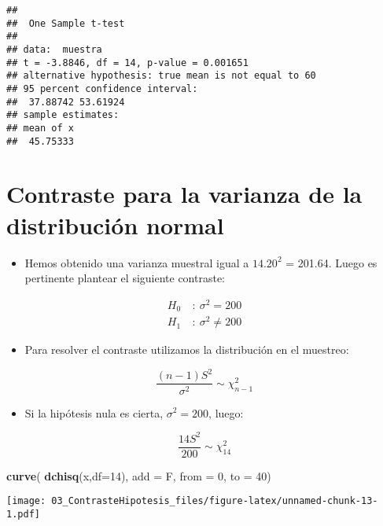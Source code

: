 \documentclass[]{article}
\newenvironment{Shaded}{\begin{snugshade}}{\end{snugshade}}
\newcommand{\KeywordTok}[1]{\textcolor[rgb]{0.13,0.29,0.53}{\textbf{#1}}}
\newcommand{\DataTypeTok}[1]{\textcolor[rgb]{0.13,0.29,0.53}{#1}}
\newcommand{\DecValTok}[1]{\textcolor[rgb]{0.00,0.00,0.81}{#1}}
\newcommand{\NormalTok}[1]{#1}
\providecommand{\tightlist}{%
  \setlength{\itemsep}{0pt}\setlength{\parskip}{0pt}}
\begin{document}
\begin{verbatim}
## 
##  One Sample t-test
## 
## data:  muestra
## t = -3.8846, df = 14, p-value = 0.001651
## alternative hypothesis: true mean is not equal to 60
## 95 percent confidence interval:
##  37.88742 53.61924
## sample estimates:
## mean of x 
##  45.75333
\end{verbatim}

\section{Contraste para la varianza de la distribución
normal}\label{contraste-para-la-varianza-de-la-distribucion-normal}

\begin{itemize}
\tightlist
\item
  Hemos obtenido una varianza muestral igual a \(14.20^2\) = 201.64.
  Luego es pertinente plantear el siguiente contraste:
\end{itemize}

\[
\begin{align}
H_0 \ & : \ \sigma^2 = 200 \\
H_1 \ & : \ \sigma^2 \neq 200
\end{align}
\]

\begin{itemize}
\tightlist
\item
  Para resolver el contraste utilizamos la distribución en el muestreo:
\end{itemize}

\[
\frac{(n-1)S^2}{\sigma^2} \sim \chi^2_{n-1}
\]

\begin{itemize}
\tightlist
\item
  Si la hipótesis nula es cierta, \(\sigma^2 = 200\), luego:
\end{itemize}

\[
\frac{14S^2}{200} \sim \chi^2_{14}
\]

\begin{Shaded}
\begin{Highlighting}[]
\KeywordTok{curve}\NormalTok{( }\KeywordTok{dchisq}\NormalTok{(x,}\DataTypeTok{df=}\DecValTok{14}\NormalTok{), }\DataTypeTok{add =}\NormalTok{ F, }\DataTypeTok{from =} \DecValTok{0}\NormalTok{, }\DataTypeTok{to =} \DecValTok{40}\NormalTok{)}
\end{Highlighting}
\end{Shaded}

\texttt{[image: 03\_ContrasteHipotesis\_files/figure-latex/unnamed-chunk-13-1.pdf]}
\end{document}
